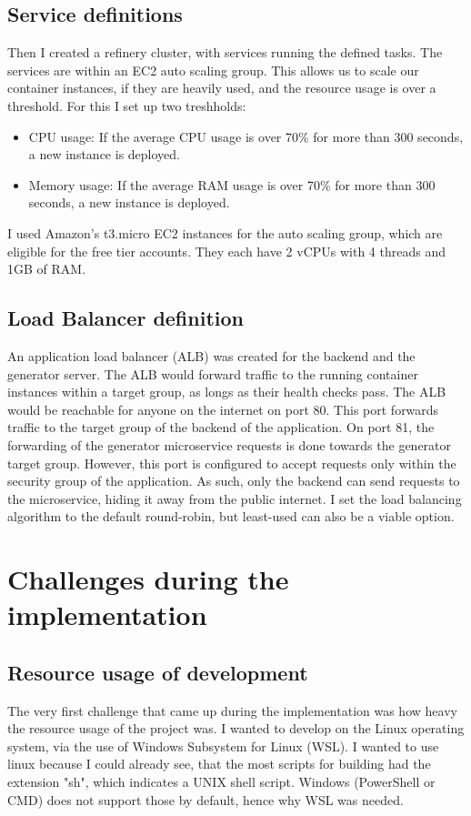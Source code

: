 		\subsection{Service definitions}
			Then I created a refinery cluster, with services running the defined tasks. The services are within an EC2 auto scaling group. 
			This allows us to scale our container instances, if they are heavily used, and the resource usage is over a threshold.
			For this I set up two treshholds:
			\begin{itemize}
				\item CPU usage: If the average CPU usage is over 70\% for more than 300 seconds, a new instance is deployed.
				\item Memory usage: If the average RAM usage is over 70\% for more than 300 seconds, a new instance is deployed.
			\end{itemize}
			I used Amazon's t3.micro EC2 instances for the auto scaling group, which are eligible for the free tier accounts. 
			They each have 2 vCPUs with 4 threads and 1GB of RAM.
		
		\subsection{Load Balancer definition}
			An application load balancer (ALB) was created for the 
			backend and the generator server. The ALB would forward traffic to the running container instances within a target group, as longs as their
			health checks pass. 
			The ALB would be reachable for anyone on the internet on port 80. This port forwards traffic to the target group of the backend of the application.
			On port 81, the forwarding of the generator microservice requests is done towards the generator target group. However, this port is configured
			to accept requests only within the security group of the application. As such, only the backend can send requests to the microservice, hiding it 
			away from the public internet.
			I set the load balancing algorithm to the default round-robin, but least-used can also be a viable option.

	\section{Challenges during the implementation} \label{challenges}
	\subsection{Resource usage of development}
		The very first challenge that came up during the implementation was how heavy the resource usage of the project was.
		I wanted to develop on the Linux operating system, via the use of Windows Subsystem for Linux (WSL). I wanted to use linux
		because I could already see, that the most scripts for building had the extension "sh", which indicates a UNIX shell script.
		Windows (PowerShell or CMD) does not support those by default, hence why WSL was needed.

